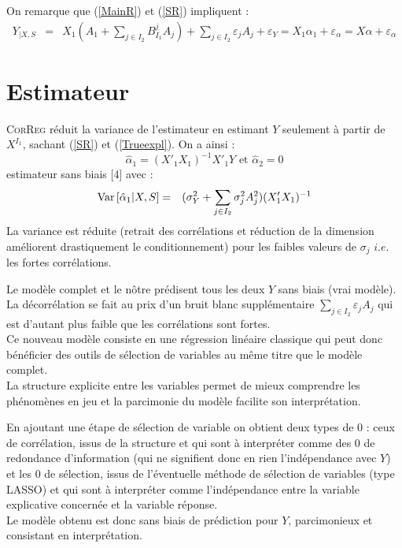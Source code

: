\documentclass[12pt]{article}
\begin{document}
On remarque que (\ref{MainR}) et (\ref{SR}) impliquent :
\begin{eqnarray}
	Y_{|X,S}&=&X_1 (A_{1}+ \sum_{j \in I_2}B^{j}_{I_1}A_{j})+  \sum_{j \in I_2}\varepsilon_{j}A_{j}+\varepsilon_Y 
					= X_1\alpha_{1}+ \varepsilon_{\alpha}=X\alpha+ \varepsilon_{\alpha} \label{Trueexpl} 			
\end{eqnarray}
\section{Estimateur}
		\textsc{CorReg} réduit la variance de l'estimateur en estimant $Y$ seulement à partir de $X^{I_1}$, sachant (\ref{SR}) et (\ref{Trueexpl}).
			On a ainsi : 
		\begin{equation}
			\hat{\alpha}_{1} = (X'_{1} X_1)^{-1}X'_{1}Y \textrm{ et } \hat{\alpha}_{2} = 0
		\end{equation}
		estimateur sans biais [4] avec :
		\begin{eqnarray}
			{\rm Var}\,[\hat{\alpha}_{1}|X,S]&=& (\sigma^2_Y+\sum_{j \in I_2}\sigma^2_{j}A_{j}^2 )(X'_{1} X_{1})^{-1}
		\end{eqnarray}
		La variance est réduite (retrait des corrélations et réduction de la dimension améliorent drastiquement le conditionnement) pour les faibles valeurs de $\sigma_j$ $i.e.$ les fortes corrélations.					
		
		Le modèle complet et le nôtre prédisent tous les deux $Y$ sans biais (vrai modèle). La décorrélation se fait au prix d'un bruit blanc supplémentaire $\sum_{j \in I_2}\varepsilon_{j}A_{j} $ qui est d'autant plus faible que les corrélations sont fortes.
	\\	
	Ce nouveau modèle consiste en une régression linéaire classique qui peut donc bénéficier des outils de sélection de variables au même titre que le modèle complet.			
		 \\		
		 La structure explicite entre les variables permet de mieux comprendre les phénomènes en jeu et la parcimonie du modèle facilite son interprétation.		

		En ajoutant une étape de sélection de variable on obtient deux types de $0$ : ceux de corrélation, issus de la structure et qui sont à interpréter comme des $0$ de redondance d'information (qui ne signifient donc en rien l'indépendance avec $Y$) et les $0$ de sélection, issus de l'éventuelle méthode de sélection de variables (type LASSO) et qui sont à interpréter comme l'indépendance entre la variable explicative concernée et la variable réponse.
			\\
		Le modèle obtenu est donc sans biais de prédiction pour $Y$, parcimonieux et consistant en interprétation.	
		
\end{document}
